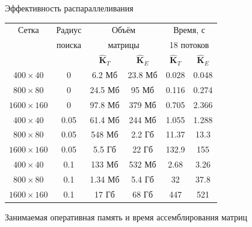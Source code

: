 \begin{frame}{Эффективность распараллеливания}
\tiny
\begin{center}
	\centering
	\begin{tabular}{|c|c|c|c|c|c|}
	\hline
	Сетка & Радиус & \multicolumn{2}{c|}{Объём}   & \multicolumn{2}{c|}{Время, с} \\
	      & поиска & \multicolumn{2}{c|}{матрицы} & \multicolumn{2}{c|}{18 потоков} \\
	\hhline{~~----}
	      &        & $\widehat{\textbf{K}}_T$ & $\widehat{\textbf{K}}_E$ & $\widehat{\textbf{K}}_T$ & $\widehat{\textbf{K}}_E$ \\
	\hline
	$400 \times 40$   & 0    & 6.2 Мб  & 23.8 Мб  & 0.028 & 0.048 \\
	\hline
	$800 \times 80$   & 0    & 24.5 Мб & 95 Мб    & 0.116 & 0.274 \\
	\hline
	$1600 \times 160$ & 0    & 97.8 Мб & 379 Мб   & 0.705 & 2.366 \\
	\hline
	$400 \times 40$   & 0.05 & 61.4 Мб & 244 Мб   & 1.055 & 1.288 \\
	\hline
	$800 \times 80$   & 0.05 & 548 Мб  & 2.2 Гб   & 11.37 & 13.3  \\
	\hline
	$1600 \times 160$ & 0.05 & 5.5 Гб  & 22 Гб    & 132.9 & 155   \\
	\hline
	$400 \times 40$   & 0.1  & 133 Мб  & 532 Мб   & 2.68  & 3.26  \\
	\hline
	$800 \times 80$   & 0.1  & 1.34 Мб & 5.4 Гб   & 32    & 37.8  \\
	\hline
	$1600 \times 160$ & 0.1  & 17 Гб   & 68 Гб    & 447   & 521   \\
	\hline
	\end{tabular}
	
	\normalsize
	Занимаемая оперативная память и время ассемблирования матриц
\end{center}
\end{frame}


